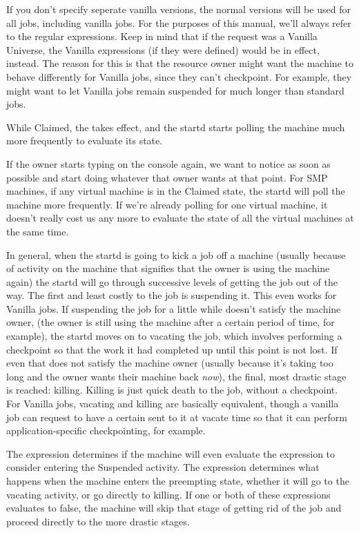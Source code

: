 If you don't specify seperate vanilla versions, the normal versions
will be used for all jobs, including vanilla jobs.  
For the purposes of this manual, we'll always refer to the regular 
expressions.
Keep in mind that if the request was a Vanilla Universe, the Vanilla
expressions (if they were defined) would be in effect, instead.
The reason for this is that the resource owner might want the machine
to behave differently for Vanilla jobs, since they can't checkpoint.
For example, they might want to let Vanilla jobs remain suspended for
much longer than standard jobs.

While Claimed, the  takes effect, and the
startd starts polling the machine much more frequently to evaluate its
state.

If the owner starts typing on the console again, we want to notice as
soon as possible and start doing whatever that owner wants at that
point.
For SMP machines, if any virtual machine is in the Claimed state, the
startd will poll the machine more frequently.
If we're already polling for one virtual machine, it doesn't really
cost us any more to evaluate the state of all the virtual machines at
the same time.

In general, when the startd is going to kick a job off a machine
(usually because of activity on the machine that signifies that the
owner is using the machine again) the startd will go through
successive levels of getting the job out of the way.
The first and least costly to the job is suspending it.
This even works for Vanilla jobs.
If suspending the job for a little while doesn't satisfy the machine
owner, (the owner is still using the machine after a certain period of
time, for example), the startd moves on to vacating the job, which
involves performing a checkpoint so that the work it had completed up
until this point is not lost.
If even that does not satisfy the machine owner (usually because it's
taking too long and the owner wants their machine back \emph{now}),
the final, most drastic stage is reached: killing.  
Killing is just quick death to the job, without a checkpoint.  
For Vanilla jobs, vacating and killing are basically equivalent,
though a vanilla job can request to have a certain  sent to it at vacate time so that it can perform
application-specific checkpointing, for example.

The  expression determines if the machine will even
evaluate the  expression to consider entering the
Suspended activity.
The  expression determines what happens when the
machine enters the preempting state, whether it will go to the vacating
activity, or go directly to killing. 
If one or both of these expressions evaluates to false, the machine
will skip that stage of getting rid of the job and proceed directly to
the more drastic stages.

